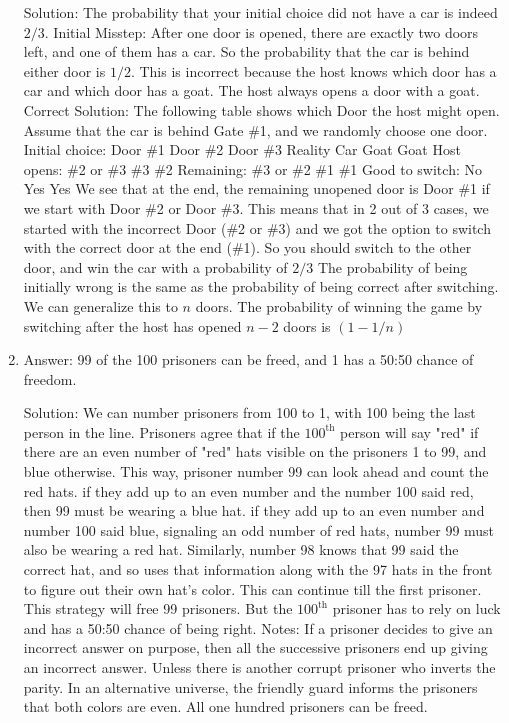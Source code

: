 \begin{enumerate}
Solution: The probability that your initial choice did not have a car is indeed $2/3$.
Initial Misstep:
After one door is opened, there are exactly two doors left, and one of them has a car. So the probability that the car is behind either door is $1/2$.
This is incorrect because the host knows which door has a car and which door has a goat. The host always opens a door with a goat.
Correct Solution:
The following table shows which Door the host might open. Assume that the car is behind Gate \#1, and we randomly choose one door.
Initial choice:
  Door \#1  
  Door \#2  
  Door \#3  
Reality
Car
Goat
Goat
Host opens:
\#2 or \#3
\#3
\#2
Remaining:
\#3 or \#2
\#1
\#1
Good to switch:
No
Yes
Yes
We see that at the end, the remaining unopened door is Door \#1 if we start with Door \#2 or Door \#3.
This means that in 2 out of 3 cases, we started with the incorrect Door (\#2 or \#3) and we got the option to switch with the correct door at the end (\#1).
So you should switch to the other door, and win the car with a probability of $2/3$
The probability of being initially wrong is the same as the probability of being correct after switching. We can generalize this to $n$ doors.
The probability of winning the game by switching after the host has opened $n-2$ doors is $(1 - 1/n)$




\item
Answer: 99 of the 100 prisoners can be freed, and 1 has a 50:50 chance of freedom.
 
Solution: We can number prisoners from 100 to 1, with 100 being the last person in the line. Prisoners agree that if the $100^{\text{th}}$ person will say "red" if there are an even number of "red" hats visible on the prisoners 1 to 99, and blue otherwise. This way, prisoner number 99 can look ahead and count the red hats. if they add up to an even number and the number 100 said red, then 99 must be wearing a blue hat. if they add up to an even number and number 100 said blue, signaling an odd number of red hats, number 99 must also be wearing a red hat.
Similarly, number 98 knows that 99 said the correct hat, and so uses that information along with the 97 hats in the front to figure out their own hat's color. This can continue till the first prisoner.
This strategy will free 99 prisoners. But the $100^{\text{th}}$  prisoner has to rely on luck and has a 50:50 chance of being right.
Notes:
If a prisoner decides to give an incorrect answer on purpose, then all the successive prisoners end up giving an incorrect answer. Unless there is another corrupt prisoner who inverts the parity.
In an alternative universe, the friendly guard informs the prisoners that both colors are even. All one hundred prisoners can be freed.




\end{enumerate}
